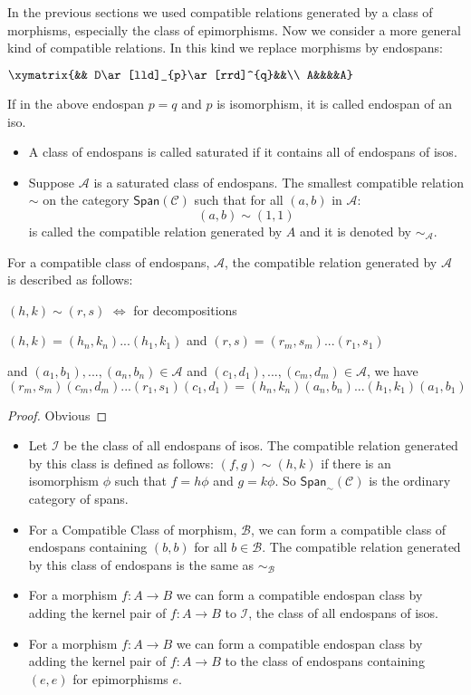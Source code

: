 \documentclass{tac}
\theoremstyle{definition}
\theoremstyle{remark}
\def\mc#1{\mathcal {#1}}
\def\C{\mc C}
\def\A{\mc A}
\def\B{\mc B}
\def\I{\mc I}
\begin{document}
In the previous sections we  used compatible relations generated by a class of morphisms, especially the class of epimorphisms. Now we consider a more general kind of compatible relations. In this kind we replace morphisms by endospans:
\begin{center}
	$\xymatrix{&& D\ar[lld]_{p}\ar[rrd]^{q}&&\\
 	A&&&&A}$
\end{center}
If in the above endospan $p=q$ and $p$ is isomorphism, it is called endospan of an iso.
\begin{definition}
	\begin{itemize}
		\item
		A class of endospans is called saturated if it contains all of endospans of isos.
		\item
		Suppose $\A$ is a saturated class of endospans. The smallest compatible relation $\sim$ on the category $\mathsf{Span}(\C)$ such that for all $(a,b)$ in $\A$:
		$$(a,b)\sim (1,1)$$
		is called the compatible relation generated by $A$ and it is denoted by $\sim_\A$.
	\end{itemize}
\end{definition}
\begin{proposition}
	For a compatible class of endospans, $\A$, the compatible relation generated by $\A$ is described as follows:
	
	$(h,k)\sim (r,s)$ $\iff$ for decompositions
	\begin{center}
			$(h,k)=(h_n,k_n)...(h_1,k_1) $ and $(r,s)=(r_m,s_m)...(r_1,s_1)$
	\end{center}
	 and
	$(a_1,b_1),...,(a_n,b_n)\in\A$ and $(c_1,d_1),...,(c_m,d_m)\in\A$, we have
	$$(r_m,s_m)(c_m,d_m)...(r_1,s_1)(c_1,d_1)=(h_n,k_n)(a_n,b_n)...(h_1,k_1)(a_1,b_1)$$
\end{proposition}
\begin{proof}
	Obvious
\end{proof}
\begin{example}
	\begin{itemize}
		\item
		Let $\I$ be the class of all endospans of isos. The compatible relation generated by this class is defined as follows:
		$(f,g)\sim(h,k)$ if there is an isomorphism $\phi$ such that $f=h\phi$ and $g=k\phi$. So $\mathsf{Span}_{\sim}(\C)$ is the ordinary category of spans.
		\item
		For a Compatible Class of morphism, $\B$, we can form a compatible class of endospans containing $(b,b)$ for all $b\in \B$. The compatible relation generated by this class of endospans is the same as $\sim_\B$
		\item
		For a morphism $f:A\rightarrow B$ we can form a compatible endospan class by adding the kernel pair of $f:A\rightarrow B$ to $\I$, the class of all endospans of isos.
		\item
		For a morphism $f:A\rightarrow B$ we can form a compatible endospan class by adding the kernel pair of $f:A\rightarrow B$ to the class of endospans containing $(e,e)$ for epimorphisms $e$.
	\end{itemize}
\end{example}
\end{document}
